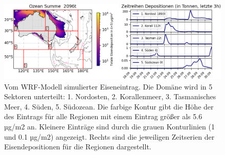 \documentclass[12pt,a4paper,onecolumn]{scrartcl}
\begin{document}
\begin{figure}
\includegraphics[width=\textwidth]{bilder/total_iron.png}
\caption{Vom WRF-Modell simulierter Eiseneintrag. Die Domäne wird in 5 Sektoren unterteilt: 1. Nordosten, 2. Korallenmeer, 3. Tasmanisches Meer, 4. Süden, 5. Südozean. Die farbige Kontur gibt die Höhe der des Eintrags für alle Regionen mit einem Eintrag größer als 5.6 µg/m2 an. Kleinere Einträge sind durch die grauen Konturlinien (1 und 0.1 µg/m2) angezeigt. Rechts sind die jeweiligen Zeitserien der Eisendepositionen für die Regionen dargestellt.} \label{fig:iron_deposition_sections}
\end{figure}
\end{document}
